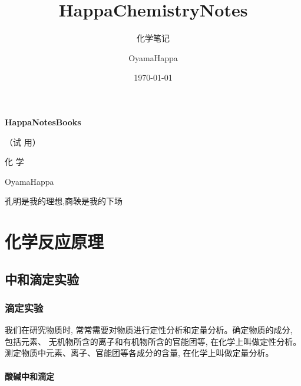\documentclass[10pt,cn]{elegantbook}
\title{HappaChemistryNotes}
\subtitle{化学笔记}
\author{OyamaHappa}
\date{\today}
\begin{document}
	
	\begin{titlepage}
		\begin{center}
			\vspace*{3cm}
			
			{\Large \textbf{HappaNotesBooks} }
			
			{\Large（试 用）}
			
			\vspace{1cm}
			
			{\Huge 化 \qquad 学}
			
			\vspace{0.5cm}
			
			
			
			
			
			
			\vspace{1cm}
			
		OyamaHappa
			
			\vfill
			
			
			孔明是我的理想,商鞅是我的下场
			
			
			
		\end{center}
	\end{titlepage}
	
	
	\tableofcontents
	
	\mainmatter

	\part{化学反应原理}
    \chapter{中和滴定实验}
	\section{滴定实验}
	
	我们在研究物质时, 常常需要对物质进行定性分析和定量分析。确定物质的成分, 包括元素、 无机物所含的离子和有机物所含的官能团等, 在化学上叫做定性分析。测定物质中元素、离子、官能团等各成分的含量, 在化学上叫做定量分析。
	
	
	\subsection{酸碱中和滴定}
	
\end{document}
